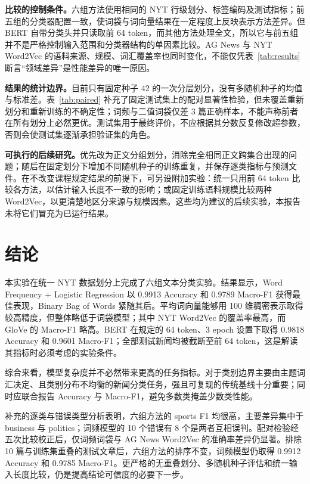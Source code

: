 \documentclass[UTF8,a4paper,10pt]{ctexart}
\begin{document}
\textbf{比较的控制条件。}六组方法使用相同的 NYT 行级划分、标签编码及测试指标；前五组的分类器配置一致，使词袋与词向量结果在一定程度上反映表示方法差异。但 BERT 自带分类头并只读取前 64 token，而其他方法处理全文，所以它与前五组并不是严格控制输入范围和分类器结构的单因素比较。AG News 与 NYT Word2Vec 的语料来源、规模、词汇覆盖率也同时变化，不能仅凭表~\ref{tab:results} 断言“领域差异”是性能差异的唯一原因。

\textbf{结果的统计边界。}目前只有固定种子 42 的一次分层划分，没有多随机种子的均值与标准差。表~\ref{tab:paired} 补充了固定测试集上的配对显著性检验，但未覆盖重新划分和重新训练的不确定性；词频与二值词袋仅差 3 篇正确样本，不能声称前者在所有划分上必然更优。测试集用于最终评价，不应根据其分数反复修改超参数，否则会使测试集逐渐承担验证集的角色。

\textbf{可执行的后续研究。}优先改为正文分组划分，消除完全相同正文跨集合出现的问题；随后在固定划分下增加不同随机种子的训练重复，并保存逐类指标与预测文件。在不改变课程规定结果的前提下，可另设附加实验：统一只用前 64 token 比较各方法，以估计输入长度不一致的影响；或固定训练语料规模比较两种 Word2Vec，以更清楚地区分来源与规模因素。这些均为建议的后续实验，本报告未将它们冒充为已运行结果。

\section{结论}

本实验在统一 NYT 数据划分上完成了六组文本分类实验。结果显示，Word Frequency + Logistic Regression 以 0.9913 Accuracy 和 0.9789 Macro-F1 获得最佳表现，Binary Bag of Words 紧随其后。平均词向量能够用 100 维稠密表示取得较高精度，但整体略低于词袋模型；其中 NYT Word2Vec 的覆盖率最高，而 GloVe 的 Macro-F1 略高。BERT 在规定的 64 token、3 epoch 设置下取得 0.9818 Accuracy 和 0.9601 Macro-F1；全部测试新闻均被截断至前 64 token，这是解读其指标时必须考虑的实验条件。

综合来看，模型复杂度并不必然带来更高的任务指标。对于类别边界主要由主题词汇决定、且类别分布不均衡的新闻分类任务，强且可复现的传统基线十分重要；同时应联合报告 Accuracy 与 Macro-F1，避免多数类掩盖少数类性能。

补充的逐类与错误类型分析表明，六组方法的 sports F1 均很高，主要差异集中于 business 与 politics；词频模型的 10 个错误有 8 个是两者互相误判。配对检验经五次比较校正后，仅词频词袋与 AG News Word2Vec 的准确率差异仍显著。排除 10 篇与训练集重叠的测试文章后，六组方法的排序不变，词频模型仍取得 0.9912 Accuracy 和 0.9785 Macro-F1。更严格的无重叠划分、多随机种子评估和统一输入长度比较，仍是提高结论可信度的必要下一步。
\end{document}
